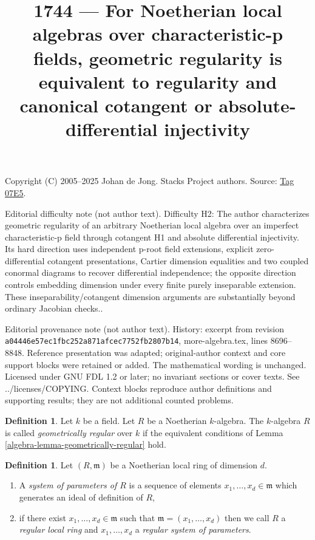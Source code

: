 \documentclass{amsart}
\theoremstyle{plain}
\theoremstyle{definition}
\newtheorem{definition}[subsection]{Definition}
\theoremstyle{remark}
\numberwithin{equation}{subsection}
\begin{document}
\title[Stacks Project, Tag 07E5]{1744 --- For Noetherian local algebras over characteristic-p fields, geometric regularity is equivalent to regularity and canonical cotangent or absolute-differential injectivity}
\maketitle
\noindent Copyright (C) 2005--2025 Johan de Jong. Stacks Project authors. Source: \href{https://stacks.math.columbia.edu/tag/07E5}{Tag 07E5}.

\noindent Editorial difficulty note (not author text). Difficulty H2: The author characterizes geometric regularity of an arbitrary Noetherian local algebra over an imperfect characteristic-p field through cotangent H1 and absolute differential injectivity. Its hard direction uses independent p-root field extensions, explicit zero-differential cotangent presentations, Cartier dimension equalities and two coupled conormal diagrams to recover differential independence; the opposite direction controls embedding dimension under every finite purely inseparable extension. These inseparability/cotangent dimension arguments are substantially beyond ordinary Jacobian checks..

\noindent Editorial provenance note (not author text). History: excerpt from revision \texttt{a0444\allowbreak 6e57e\allowbreak c1fbc\allowbreak 252a8\allowbreak 71afc\allowbreak ec775\allowbreak 2fb28\allowbreak 07b14}, more-algebra.tex, lines 8696--8848. Reference presentation was adapted; original-author context and core support blocks were retained or added. The mathematical wording is unchanged. Licensed under GNU FDL 1.2 or later; no invariant sections or cover texts. See ../licenses/COPYING. Context blocks reproduce author definitions and supporting results; they are not additional counted problems.

\begin{definition}
\label{algebra-definition-geometrically-regular}
Let $k$ be a field. Let $R$ be a Noetherian $k$-algebra.
The $k$-algebra $R$ is called {\it geometrically regular} over $k$ if
the equivalent conditions of Lemma \ref{algebra-lemma-geometrically-regular} hold.
\end{definition}

\begin{definition}
\label{algebra-definition-regular-local}
Let $(R, \mathfrak m)$ be a Noetherian local ring of dimension $d$.
\begin{enumerate}
\item A {\it system of parameters of $R$} is a sequence of elements
$x_1, \ldots, x_d \in \mathfrak m$ which generates an ideal of
definition of $R$,
\item if there exist $x_1, \ldots, x_d \in \mathfrak m$
such that $\mathfrak m = (x_1, \ldots, x_d)$ then we call
$R$ a {\it regular local ring} and $x_1, \ldots, x_d$ a {\it regular
system of parameters}.
\end{enumerate}
\end{definition}
\end{document}

